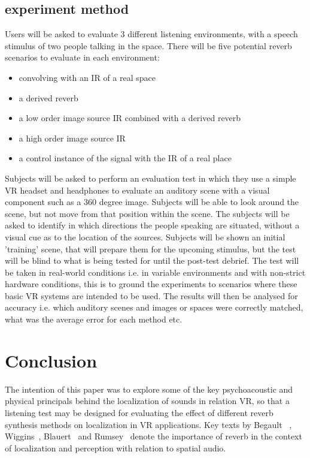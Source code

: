 \documentclass[paper=a4, fontsize=10pt, font=arial]{scrartcl} %
\numberwithin{equation}{section} %
\numberwithin{figure}{section} %
\numberwithin{table}{section} %
\begin{document}
\subsection{experiment method}
Users will be asked to evaluate 3 different listening environments, with a speech stimulus of two people talking in the space. There will be five potential reverb scenarios to evaluate in each environment: 
\begin{itemize}
\item convolving with an IR of a real space
\item a derived reverb
\item a low order image source IR combined with a derived reverb
\item a high order image source IR
\item a control instance of the signal with the IR of a real place
\end{itemize}
Subjects will be asked to perform an evaluation test in which they use a simple VR headset and headphones to evaluate an auditory scene with a visual component such as a 360 degree image. Subjects will be able to look around the scene, but not move from that position within the scene. The subjects will be asked to identify in which directions the people speaking are situated, without a visual cue as to the location of the sources. Subjects will be shown an initial 'training' scene, that will prepare them for the upcoming stimulus, but the test will be blind to what is being tested for until the post-test debrief. The test will be taken in real-world conditions i.e. in variable environments and with non-strict hardware conditions, this is to ground the experiments to scenarios where these basic VR systems are intended to be used. The results will then be analysed for accuracy i.e. which auditory scenes and images or spaces were correctly matched, what was the average error for each method etc.

\newpage
\section{Conclusion}
The intention of this paper was to explore some of the key psychoacoustic and physical principals behind the localization of sounds in relation VR, so that a listening test may be designed for evaluating the effect of different reverb synthesis methods on localization in VR applications. Key texts by Begault~\cite{Begault1995} , Wiggins~\cite{Wiggins2004}, Blauert~\cite{Blauert1997} and Rumsey~\cite{rumsey2012spatial} denote the importance of reverb in the context of localization and perception with relation to spatial audio.
\end{document}
